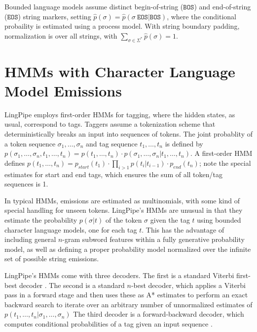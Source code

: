 \documentclass[twoside,11pt]{article}
\begin{document}
Bounded language models assume distinct begin-of-string
($\mathtt{BOS}$) and end-of-string ($\mathtt{EOS}$) string markers,
setting $\hat{p}(\sigma) =
\hat{p}(\sigma \ \mathtt{EOS} | \mathtt{BOS})$, where the conditional
probaility is estimated using a process model.  With string boundary
padding, normalization is over all strings, with $\sum_{\sigma \in
\Sigma^{*}} \hat{p}(\sigma) = 1$.



\section{HMMs with Character Language Model Emissions}

LingPipe employs first-order HMMs for tagging, where the hidden
states, as usual, correspond to tags.  Taggers assume a tokenization
scheme that deterministically breaks an input into sequences of
tokens.  The joint probablity of a token sequence $\sigma_1, \ldots,
\sigma_n$ and tag sequence $t_1, \ldots, t_n$ is defined by
$p(\sigma_1, \ldots, \sigma_n, t_1, \ldots, t_n) = p(t_1,\ldots,t_n)
\cdot p(\sigma_1,\ldots,\sigma_n | t_1, \ldots, t_n)$.  A first-order
HMM defines $p(t_1,\ldots,t_n) = p_{start}(t_1) \cdot \prod_{i > 1}
p(t_i|t_{i-1}) \cdot p_{end}(t_n)$; note the special estimates for
start and end tags, which ensures the sum of all token/tag sequences
is 1.

In typical HMMs, emissions are estimated as multinomials, with some
kind of special handling for unseen tokens.  LingPipe's HMMs are
unusual in that they estimate the probability $p(\sigma|t)$ of the
token $\sigma$ given the tag $t$ using bounded character language
models, one for each tag $t$.  This has the advantage of including
general $n$-gram subword features within a fully generative
probability model, as well as defining a proper probability model
normalized over the infinite set of possible string emissions.

LingPipe's HMMs come with three decoders.  The first is a standard
Viterbi first-best decoder \cite{manning}.  The second is a standard
$n$-best decoder, which applies a Viterbi pass in a forward stage and
then uses these as A* estimates to perform an exact backward search to
iterate over an arbitrary number of unnormalized estimates of
$p(t_1,\ldots,t_n | \sigma_1, \ldots,
\sigma_n)$ The third decoder is a forward-backward decoder,
which computes conditional probabilities of a tag given an input
sequence \cite{manning}.
\end{document}
